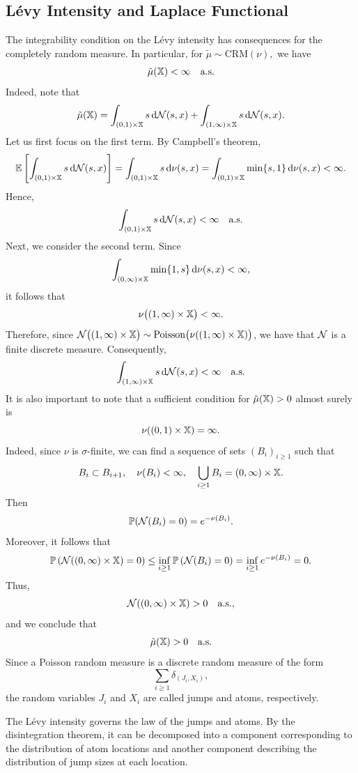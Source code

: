 \subsection{Lévy Intensity and Laplace Functional}\label{subsection:bnp_toolbox_levy_intensity}

The integrability condition on the L\'evy intensity has consequences for the completely random measure. In particular, for $\tilde{\mu}\sim \mathrm{CRM}(\nu),$ we have
\[
\tilde{\mu}(\mathbb{X}) <\infty \quad \text{a.s.}
\]
Indeed, note that
\[
\tilde{\mu}(\mathbb{X}) = \int_{(0,1)\times \mathbb{X}} s\,\mathrm{d}\mathcal{N}(s,x) + \int_{(1,\infty)\times \mathbb{X}} s\,\mathrm{d}\mathcal{N}(s,x).
\]
Let us first focus on the first term. By Campbell's theorem,
\[
\mathbb{E}\left[\int_{(0,1)\times \mathbb{X}} s\,\mathrm{d}\mathcal{N}(s,x)\right] = \int_{(0,1)\times \mathbb{X}} s\,\mathrm{d}\nu(s,x) = \int_{(0,1)\times \mathbb{X}} \min\{s,1\}\,\mathrm{d}\nu(s,x) < \infty.
\]
Hence,
\[
\int_{(0,1)\times \mathbb{X}} s\,\mathrm{d}\mathcal{N}(s,x) < \infty
\quad \text{a.s.}
\]
Next, we consider the second term. Since
\[
\int_{(0,\infty)\times \mathbb{X}} \min\{1,s\}\,\mathrm{d}\nu(s,x) < \infty,
\]
it follows that
\[
\nu\big((1,\infty)\times \mathbb{X}\big) < \infty.
\]
Therefore, since
$
\mathcal{N}\big((1,\infty)\times \mathbb{X}\big)
\sim \mathrm{Poisson}\big(\nu((1,\infty)\times \mathbb{X})\big)$,
we have that $\mathcal{N}$ is a finite discrete measure. Consequently,
\[
\int_{(1,\infty)\times \mathbb{X}} s\,\mathrm{d}\mathcal{N}(s,x) < \infty \quad \text{a.s.}
\]
It is also important to note that a sufficient condition for $\tilde{\mu}(\mathbb{X}) > 0$ almost surely is
\[
\nu((0,1)\times \mathbb{X}) = \infty.
\]
Indeed, since $\nu$ is $\sigma$-finite, we can find a sequence of sets $(B_i)_{i\geq 1}$ such that
\[
B_i \subset B_{i+1}, \quad \nu(B_i) < \infty, \quad \bigcup_{i\geq 1} B_i = (0,\infty) \times \mathbb{X}.
\]
Then
\[
\mathbb{P}(\mathcal{N}(B_i) = 0) = e^{-\nu(B_i)}.
\]
Moreover, it follows that
\[
\mathbb{P}\left(\mathcal{N}((0,\infty)\times \mathbb{X}) = 0\right)
\leq
\inf_{i \geq 1}\mathbb{P}\left(\mathcal{N}(B_i)=0\right)
=
\inf_{i \geq 1} e^{-\nu(B_i)}
= 0.
\]
Thus,
\[
\mathcal{N}((0,\infty)\times \mathbb{X}) > 0 \quad \text{a.s.},
\]
and we conclude that
\[
\tilde{\mu}(\mathbb{X}) > 0 \quad \text{a.s.}
\]
Since a Poisson random measure is a discrete random measure of the form
\[
\sum_{i \geq 1}\delta_{(J_i,X_i)},
\]
the random variables $J_i$ and $X_i$ are called jumps and atoms, respectively.

The L\'evy intensity governs the law of the jumps and atoms. By the disintegration theorem, it can be decomposed into a component corresponding to the distribution of atom locations and another component describing the distribution of jump sizes at each location.

